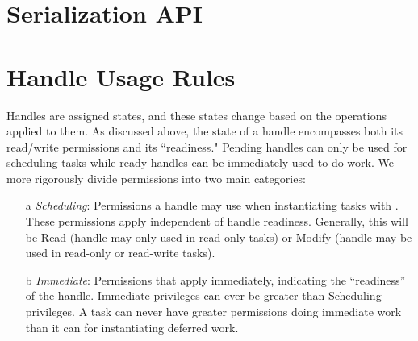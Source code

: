 

\section{Serialization API}










\section{Handle Usage Rules}
\label{sec:handlerules}

Handles are assigned states, and these states change 
based on the operations applied to them.  
As discussed above, the state of a handle encompasses both its read/write permissions and its ``readiness."
Pending handles can only be used for scheduling tasks while ready handles can be immediately used to do work.
We more rigorously divide permissions into two main categories: 
\begin{itemize}
\item[a] {\it Scheduling}: Permissions a handle may use when instantiating tasks with .
These permissions apply independent of handle readiness. 
Generally, this will be Read (handle may only used in read-only tasks) or Modify (handle may be used in read-only or read-write tasks). 
\item[b] {\it Immediate}: Permissions that apply immediately, indicating the ``readiness'' of the handle.  Immediate privileges can ever be greater than Scheduling privileges.
A task can never have greater permissions doing immediate work than it can for instantiating deferred work.
\end{itemize}

